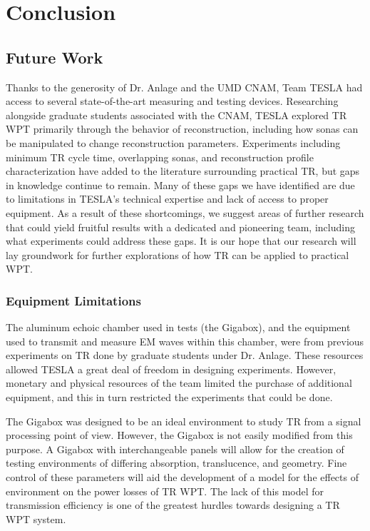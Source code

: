 \chapter{Conclusion}

\label{ch:conclusion}


\section{Future Work}


Thanks to the generosity of Dr. Anlage and the UMD CNAM, Team TESLA had access to several state-of-the-art measuring and testing devices. Researching alongside graduate students associated with the CNAM, TESLA explored TR WPT primarily through the behavior of reconstruction, including how sonas can be manipulated to change reconstruction parameters.  Experiments including minimum TR cycle time, overlapping sonas, and reconstruction profile characterization have added to the literature surrounding practical TR, but gaps in knowledge continue to remain.  Many of these gaps we have identified are due to limitations in TESLA's technical expertise and lack of  access to proper equipment.  As a result of these shortcomings, we suggest areas of further research that could yield fruitful results with a dedicated and pioneering team, including what experiments could address these gaps.  It is our hope that our research will lay groundwork for further explorations of how TR can be applied to practical WPT.

\subsection{Equipment Limitations}

The aluminum echoic chamber used in tests (the Gigabox), and the equipment used to transmit and measure EM waves within this chamber, were from previous experiments on TR done by graduate students under Dr. Anlage.  These resources allowed TESLA a great deal of freedom in designing experiments.  However, monetary and physical resources of the team limited the purchase of additional equipment, and this in turn restricted the experiments that could be done.

The Gigabox was designed to be an ideal environment to study TR from a signal processing point of view. However, the Gigabox is not easily modified from this purpose. A Gigabox with interchangeable panels will allow for the creation of testing environments of differing absorption, translucence, and geometry. Fine control of these parameters will aid the development of a model for the effects of environment on the power losses of TR WPT. The lack of this model for transmission efficiency is one of the greatest hurdles towards designing a TR WPT system.

